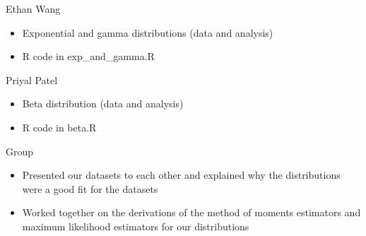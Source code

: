 \documentclass[12pt, letterpaper]{article}
\begin{document}
Ethan Wang
\begin{itemize}[leftmargin=50pt]
  \item Exponential and gamma distributions (data and analysis)
  \item R code in exp\_and\_gamma.R
\end{itemize}

Priyal Patel
\begin{itemize}[leftmargin=50pt]
  \item Beta distribution (data and analysis)
  \item R code in beta.R
\end{itemize}

Group
\begin{itemize}[leftmargin=50pt]
  \item Presented our datasets to each other and explained why the distributions were a good fit for the datasets
  \item Worked together on the derivations of the method of moments estimators and maximum likelihood estimators for our distributions
\end{itemize}
\end{document}
